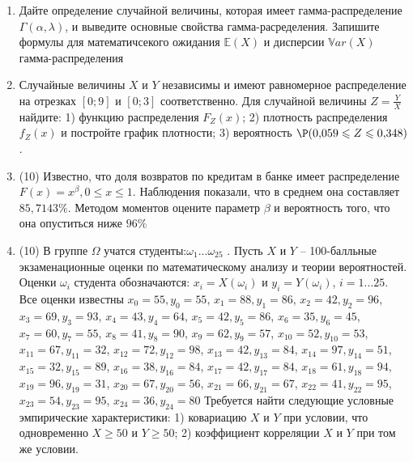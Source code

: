 \documentclass[a4paper,10pt]{article}
\begin{document}
\begin{enumerate}


\item

Дайте определение случайной величины, которая имеет гамма-распределение $\Gamma(\alpha,  \lambda)$, и выведите основные свойства гамма-расределения. Запишите формулы для математичсекого ожидания
$\mathbb{E}(X)$ и дисперсии $\mathbb{V}ar(X)$ гамма-распределения


\item



Случайные величины $X$ и $Y$ независимы и имеют равномерное
распределение на отрезках $[0;9]$ и $[0;3]$ соответственно. Для случайной величины $Z=\frac{Y}{X}$ найдите: 
1) функцию распределения $F_Z(x)$;
2) плотность распределения $f_Z(x)$ и постройте график плотности;
3) вероятность $\P(0,\!059\leqslant Z\leqslant 0,\!348)$.


\item


(10) Известно, что доля возвратов по кредитам в банке имеет распределение $F(x) = x ^{\beta}, 0 \leqslant x \leqslant 1$.
Наблюдения показали, что в среднем она составляет $85,7143\%$. Методом моментов оцените параметр $\beta$ и
вероятность того, что она опуститься ниже $96\%$


\item


(10) В группе $\Omega$ учатся студенты:$\omega _{1}...\omega _{25}$ . Пусть $X$ и $Y$ – 100-балльные экзаменационные оценки по
математическому анализу и теории вероятностей. Оценки $\omega _{i}$ студента обозначаются: $x _{i} = X(\omega _{i})$ и $y _{i} = Y(\omega _{i})$, $i = 1...25$. Все оценки известны
$x _{0} = 55, y _{0} = 55$, $x _{1} = 88, y _{1} = 86$, $x _{2} = 42, y _{2} = 96$, $x _{3} = 69, y _{3} = 93$, $x _{4} = 43, y _{4} = 64$, $x _{5} = 42, y _{5} = 86$, $x _{6} = 35, y _{6} = 45$, $x _{7} = 60, y _{7} = 55$, $x _{8} = 41, y _{8} = 90$, $x _{9} = 62, y _{9} = 57$, $x _{10} = 52, y _{10} = 53$, $x _{11} = 67, y _{11} = 32$, $x _{12} = 72, y _{12} = 98$, $x _{13} = 42, y _{13} = 84$, $x _{14} = 97, y _{14} = 51$, $x _{15} = 32, y _{15} = 89$, $x _{16} = 38, y _{16} = 84$, $x _{17} = 42, y _{17} = 84$, $x _{18} = 61, y _{18} = 94$, $x _{19} = 96, y _{19} = 31$, $x _{20} = 67, y _{20} = 56$, $x _{21} = 66, y _{21} = 67$, $x _{22} = 41, y _{22} = 95$, $x _{23} = 54, y _{23} = 95$, $x _{24} = 36, y _{24} = 80$
Требуется
найти следующие условные эмпирические характеристики: 1) ковариацию $X$ и $Y$ при условии, что одновременно $X \geqslant 50$
 и $Y \geqslant 50$; 2) коэффициент корреляции $X$ и $Y$ при том же условии.



\end{enumerate}
\end{document}
